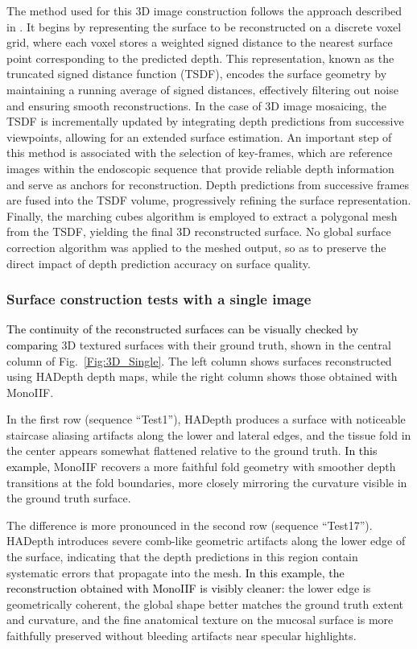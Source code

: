 \documentclass[a4paper,fleqn]{cas-dc}
\begin{document}
The method used for this 3D image construction follows the approach described in \citep{Recasens_IEEERAL_2021}. It begins by representing the surface to be reconstructed on a discrete voxel grid, where each voxel stores a weighted signed distance to the nearest surface point corresponding to the predicted depth. This representation, known as the truncated signed distance function (TSDF), encodes the surface geometry by maintaining a running average of signed distances, effectively filtering out noise and ensuring smooth reconstructions. In the case of 3D image mosaicing, the TSDF is incrementally updated by integrating depth predictions from successive viewpoints, allowing for an extended surface estimation. An important step of this 
method is associated with the selection of key-frames, which are reference images within the endoscopic sequence that provide reliable depth information and serve as anchors for reconstruction. Depth predictions from successive frames are fused into the TSDF volume, progressively refining the surface representation. 
Finally, the marching cubes algorithm \citep{Lorensen_SIGGRAPH_1987} is employed to extract a polygonal mesh from the TSDF, yielding the final 3D reconstructed surface. No global surface correction algorithm was applied to the meshed output, so as to preserve the direct impact of depth prediction accuracy on surface quality.

\subsubsection*{Surface construction tests with a single image}
\textcolor{black}{The continuity of the reconstructed surfaces can be visually checked by comparing} 3D textured surfaces with their ground truth, shown in the central column of 
Fig.~\ref{Fig:3D_Single}. The left column shows surfaces reconstructed using HADepth depth maps, while the right column shows those obtained with MonoIIF.

In the first row (sequence ``Test1''), HADepth produces a surface with noticeable staircase aliasing artifacts along the lower and lateral edges, and the tissue fold 
in the center appears somewhat flattened relative to the ground truth. \textcolor{black}{In this example,} MonoIIF recovers a more faithful fold geometry with smoother depth transitions at the fold boundaries, more closely mirroring the curvature visible in the ground truth surface.

The difference is more pronounced in the second row (sequence ``Test17''). HADepth introduces severe comb-like geometric artifacts along the lower edge of the surface, indicating that the depth predictions in this region contain systematic errors that propagate into the mesh. \textcolor{black}{In this example, the reconstruction obtained with MonoIIF is visibly cleaner:} the lower edge is geometrically coherent, the global shape better matches the ground truth extent and curvature, and the fine anatomical texture on the mucosal surface is more faithfully preserved without bleeding artifacts near specular highlights.
\end{document}
